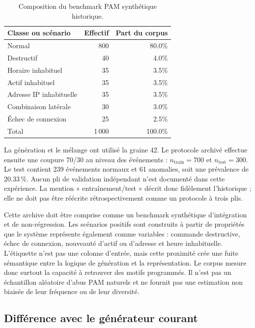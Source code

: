 \documentclass[11pt,a4paper,oneside]{report}
\theoremstyle{definition}
\theoremstyle{plain}
\begin{document}
\begin{table}[tb]
  \centering
  \caption{Composition du benchmark PAM synthétique historique.}
  \label{tab:eval-dataset}
  \small
  \begin{tabular}{@{}lrr@{}}
    \toprule
    Classe ou scénario & Effectif & Part du corpus \\
    \midrule
    Normal & 800 & 80.0\% \\
    Destructif & 40 & 4.0\% \\
    Horaire inhabituel & 35 & 3.5\% \\
    Actif inhabituel & 35 & 3.5\% \\
    Adresse IP inhabituelle & 35 & 3.5\% \\
    Combinaison latérale & 30 & 3.0\% \\
    Échec de connexion & 25 & 2.5\% \\
    \midrule
    Total & 1\,000 & 100.0\% \\
    \bottomrule
  \end{tabular}
\end{table}

La génération et le mélange ont utilisé la graine 42. Le protocole archivé
effectue ensuite une coupure 70/30 au niveau des événements :
$n_{\mathrm{train}}=700$ et $n_{\mathrm{test}}=300$. Le test contient 239
événements normaux et 61 anomalies, soit une prévalence de 20.33\,\%. Aucun pli
de validation indépendant n'est documenté dans cette expérience. La mention
« entraînement/test » décrit donc fidèlement l'historique ; elle ne doit pas
être réécrite rétrospectivement comme un protocole à trois plis.

Cette archive doit être comprise comme un benchmark synthétique d'intégration
et de non-régression. Les scénarios positifs sont construits à partir de
propriétés que le système représente également comme variables : commande
destructive, échec de connexion, nouveauté d'actif ou d'adresse et heure
inhabituelle. L'étiquette n'est pas une colonne d'entrée, mais cette proximité
crée une fuite sémantique entre la logique de génération et la représentation.
Le corpus mesure donc surtout la capacité à retrouver des motifs programmés.
Il n'est pas un échantillon aléatoire d'abus PAM naturels et ne fournit pas une
estimation non biaisée de leur fréquence ou de leur diversité.

\subsection{Différence avec le générateur courant}
\end{document}
